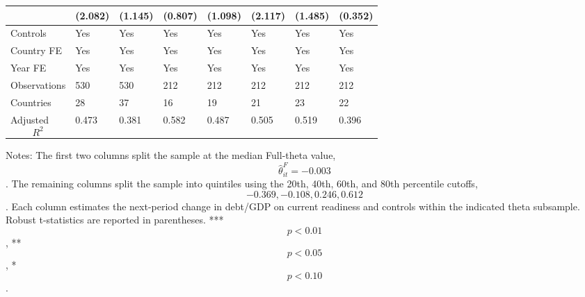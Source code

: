 \begin{table}[H]
\begin{threeparttable}
\begin{tabularx}{\textwidth}{lYYYYYYY}
  & (2.082) & (1.145) & (0.807) & (1.098) & (2.117) & (1.485) & (0.352) \\
\midrule
Controls & Yes & Yes & Yes & Yes & Yes & Yes & Yes \\
Country FE & Yes & Yes & Yes & Yes & Yes & Yes & Yes \\
Year FE & Yes & Yes & Yes & Yes & Yes & Yes & Yes \\
Observations & 530 & 530 & 212 & 212 & 212 & 212 & 212 \\
Countries & 28 & 37 & 16 & 19 & 21 & 23 & 22 \\
Adjusted $$R^2$$ & 0.473 & 0.381 & 0.582 & 0.487 & 0.505 & 0.519 & 0.396 \\
\bottomrule
\end{tabularx}
\begin{tablenotes}[flushleft]\footnotesize
\item Notes: The first two columns split the sample at the median Full-theta value, $$\widehat{\theta}^{F}_{it}=-0.003$$. The remaining columns split the sample into quintiles using the 20th, 40th, 60th, and 80th percentile cutoffs, $$-0.369, -0.108, 0.246, 0.612$$. Each column estimates the next-period change in debt/GDP on current readiness and controls within the indicated theta subsample. Robust t-statistics are reported in parentheses. *** $$p<0.01$$, ** $$p<0.05$$, * $$p<0.10$$.
\end{tablenotes}
\end{threeparttable}
\end{table}
